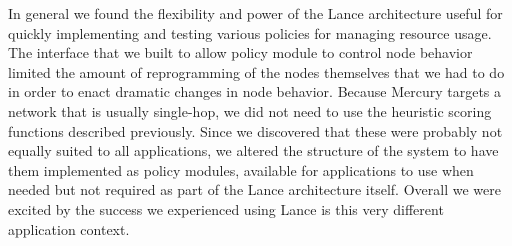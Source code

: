 In general we found the flexibility and power of the Lance architecture
useful for quickly implementing and testing various policies for managing
resource usage. The interface that we built to allow policy module to control
node behavior limited the amount of reprogramming of the nodes themselves
that we had to do in order to enact dramatic changes in node behavior.
Because Mercury targets a network that is usually single-hop, we did not need
to use the heuristic scoring functions described previously. Since we
discovered that these were probably not equally suited to all applications,
we altered the structure of the system to have them implemented as policy
modules, available for applications to use when needed but not required as
part of the Lance architecture itself. Overall we were excited by the success
we experienced using Lance is this very different application context.
